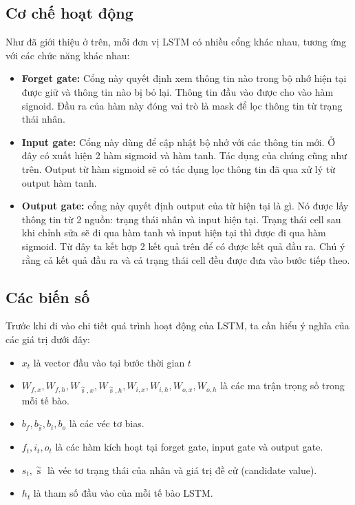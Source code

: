 \subsection{Cơ chế hoạt động}

Như đã giới thiệu ở trên, mỗi đơn vị LSTM có nhiều cổng khác nhau, tương ứng với các chức năng khác nhau:

\begin{itemize}
	\item \textbf{Forget gate:} Cổng này quyết định xem thông tin nào trong bộ nhớ hiện tại được giữ và thông tin nào bị bỏ lại. Thông tin đầu vào được cho vào hàm signoid. Đầu ra của hàm này đóng vai trò là mask để lọc thông tin từ trạng thái nhân.
	\item \textbf{Input gate:} Cổng này dùng để cập nhật bộ nhớ với các thông tin mới. Ở đây có xuất hiện 2 hàm sigmoid và hàm tanh. Tác dụng của chúng cũng như trên. Output từ hàm sigmoid sẽ có tác dụng lọc thông tin đã qua xử lý từ output hàm tanh.
	\item \textbf{Output gate:} cổng này quyết định output của từ hiện tại là gì. Nó được lấy thông tin từ 2 nguồn: trạng thái nhân và input hiện tại. Trạng thái cell sau khi chỉnh sửa sẽ đi qua hàm tanh và input hiện tại thì được đi qua hàm sigmoid. Từ đây ta kết hợp 2 kết quả trên để có được kết quả đầu ra. Chú ý rằng cả kết quả đầu ra và cả trạng thái cell đều được đưa vào bước tiếp theo.
\end{itemize}

\subsection*{Các biến số}
Trước khi đi vào chi tiết quá trình hoạt động của LSTM, ta cần hiểu ý nghĩa của các giá trị dưới đây:

\begin{itemize}
	\item $ x_t $ là vector đầu vào tại bước thời gian $ t $
	\item $ {W_{f,x}},{W_{f,h}},{W_{\mathop s\limits^ \sim  ,x}},{W_{\mathop s\limits^ \sim  ,h}},{W_{i,x}},{W_{i,h}},{W_{o,x}},{W_{o,h}} $ là các ma trận trọng số trong mỗi tế bào.
	\item $ {b_f},{b_{\mathop s\limits^ \sim  }},{b_i},{b_o} $ là các véc tơ bias.
	\item $ {f_t},{i_t},{o_t} $ là các hàm kích hoạt tại forget gate, input gate và output gate.
	\item $ {s_t},\mathop s\limits^ \sim $ là véc tơ trạng thái của nhân và giá trị đề cử (candidate value).
	\item $ h_t $ là tham số đầu vào của mỗi tế bào LSTM.
\end{itemize}


